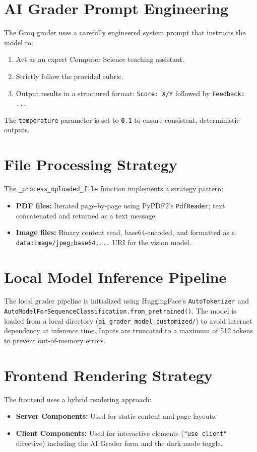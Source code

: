 \documentclass[12pt,a4paper]{report}
\begin{document}
\section{AI Grader Prompt Engineering}
The Groq grader uses a carefully engineered system prompt that instructs the model to:
\begin{enumerate}
    \item Act as an expert Computer Science teaching assistant.
    \item Strictly follow the provided rubric.
    \item Output results in a structured format: \texttt{Score: X/Y} followed by \texttt{Feedback: ...}
\end{enumerate}

The \texttt{temperature} parameter is set to \texttt{0.1} to ensure consistent, deterministic outputs.

\section{File Processing Strategy}
The \texttt{\_process\_uploaded\_file} function implements a strategy pattern:
\begin{itemize}
    \item \textbf{PDF files:} Iterated page-by-page using PyPDF2's \texttt{PdfReader}; text concatenated and returned as a text message.
    \item \textbf{Image files:} Binary content read, base64-encoded, and formatted as a \texttt{data:image/jpeg;base64,...} URI for the vision model.
\end{itemize}

\section{Local Model Inference Pipeline}
The local grader pipeline is initialized using HuggingFace's \texttt{AutoTokenizer} and
\texttt{AutoModelForSequenceClassification.from\_pretrained()}. The model is loaded from a local
directory (\texttt{ai\_grader\_model\_customized/}) to avoid internet dependency at inference time.
Inputs are truncated to a maximum of 512 tokens to prevent out-of-memory errors.

\section{Frontend Rendering Strategy}
The frontend uses a hybrid rendering approach:
\begin{itemize}
    \item \textbf{Server Components:} Used for static content and page layouts.
    \item \textbf{Client Components:} Used for interactive elements (\texttt{"use client"} directive) including the AI Grader form and the dark mode toggle.
\end{itemize}
\end{document}
